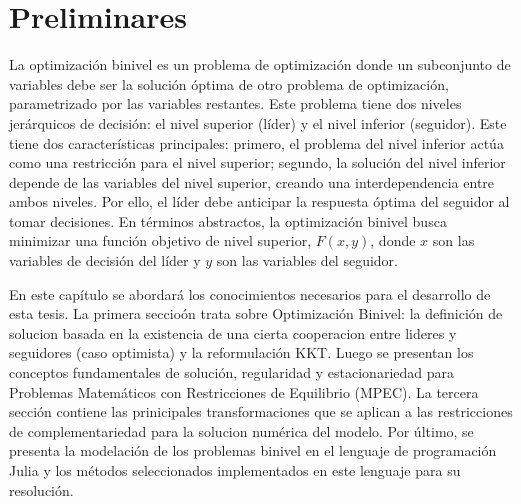 \chapter{Preliminares}


La optimización binivel es un problema de optimización donde un subconjunto de variables debe ser la solución óptima de otro problema de optimización, parametrizado por las variables restantes. Este problema tiene dos niveles jerárquicos de decisión: el nivel superior (líder) y el nivel inferior (seguidor).
Este tiene dos características principales: primero, el problema del nivel inferior actúa como una restricción para el nivel superior; segundo, la solución del nivel inferior depende de las variables del nivel superior, creando una interdependencia entre ambos niveles. Por ello, el líder debe anticipar la respuesta óptima del seguidor al tomar decisiones.
En términos abstractos, la optimización binivel busca minimizar una función objetivo de nivel superior, $F(x, y)$, donde $x$ son las variables de decisión del líder y $y$ son las variables del seguidor. 

En este capítulo se abordará los conocimientos necesarios para el desarrollo de esta tesis. La primera seccio\'on trata  sobre Optimización Binivel: la definici\'on de solucion basada en la existencia de una cierta cooperacion entre lideres y seguidores (caso  optimista) y la reformulación KKT. Luego se presentan los conceptos fundamentales  de soluci\'on, regularidad y estacionariedad para   Problemas Matemáticos con Restricciones de Equilibrio (MPEC). La tercera secci\'on contiene las prinicipales transformaciones que se aplican a las restricciones de complementariedad para la solucion num\'erica del modelo. Por último, se presenta la modelación de los problemas binivel en el lenguaje de programación Julia y los métodos seleccionados implementados en este lenguaje para su resolución. 

